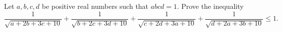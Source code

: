 Let $a,b,c,d$ be positive real numbers such that $abcd=1$. Prove the inequality\[\frac{1}{\sqrt{a+2b+3c+10}}+\frac{1}{\sqrt{b+2c+3d+10}}+\frac{1}{\sqrt{c+2d+3a+10}}+\frac{1}{\sqrt{d+2a+3b+10}} \le 1.\]